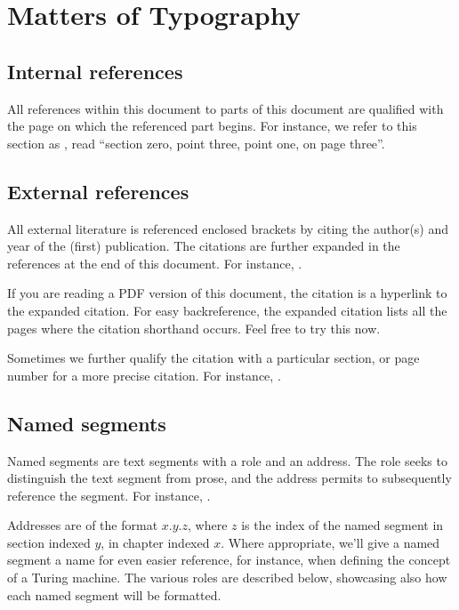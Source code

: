 \section{Matters of Typography}

\subsection{Internal references} \label{sec:introduction:internal-references}

All references within this document to parts of this document are qualified
with the page on which the referenced part begins. For instance, we refer to
this section as , read ``section
zero, point three, point one, on page three''.

\subsection{External references} \label{sec:introduction:external-references}

All external literature is referenced enclosed brackets by citing the author(s)
and year of the (first) publication. The citations are further expanded in the
references at the end of this document. For instance, \cite{sipser-2013}.

If you are reading a PDF version of this document, the citation is a hyperlink
to the expanded citation. For easy backreference, the expanded citation lists
all the pages where the citation shorthand occurs. Feel free to try this now.

Sometimes we further qualify the citation with a particular section, or page
number for a more precise citation.  For instance,
\cite[\chs~1--2]{sipser-2013}.

\subsection{Named segments}

Named segments are text segments with a role and an address. The role seeks to
distinguish the text segment from prose, and the address permits to
subsequently reference the segment. For instance, .

Addresses are of the format \mbox{$x$.$y$.$z$}, where $z$ is the index of the
named segment in section indexed $y$, in chapter indexed $x$. Where
appropriate, we'll give a named segment a name for even easier reference, for
instance, when defining the concept of a Turing machine. The various roles are
described below, showcasing also how each named segment will be formatted.

